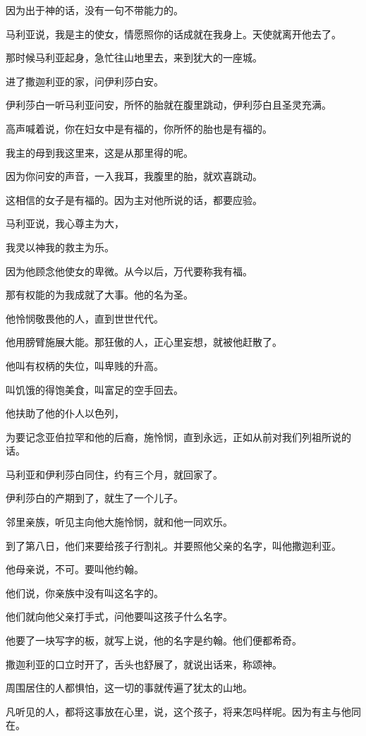 \documentclass[12pt,oneside]{book}
\begin{document}
因为出于神的话，没有一句不带能力的。

马利亚说，我是主的使女，情愿照你的话成就在我身上。天使就离开他去了。

那时候马利亚起身，急忙往山地里去，来到犹大的一座城。

进了撒迦利亚的家，问伊利莎白安。

伊利莎白一听马利亚问安，所怀的胎就在腹里跳动，伊利莎白且圣灵充满。

高声喊着说，你在妇女中是有福的，你所怀的胎也是有福的。

我主的母到我这里来，这是从那里得的呢。

因为你问安的声音，一入我耳，我腹里的胎，就欢喜跳动。

这相信的女子是有福的。因为主对他所说的话，都要应验。

马利亚说，我心尊主为大，

我灵以神我的救主为乐。

因为他顾念他使女的卑微。从今以后，万代要称我有福。

那有权能的为我成就了大事。他的名为圣。

他怜悯敬畏他的人，直到世世代代。

他用膀臂施展大能。那狂傲的人，正心里妄想，就被他赶散了。

他叫有权柄的失位，叫卑贱的升高。

叫饥饿的得饱美食，叫富足的空手回去。

他扶助了他的仆人以色列，

为要记念亚伯拉罕和他的后裔，施怜悯，直到永远，正如从前对我们列祖所说的话。

马利亚和伊利莎白同住，约有三个月，就回家了。

伊利莎白的产期到了，就生了一个儿子。

邻里亲族，听见主向他大施怜悯，就和他一同欢乐。

到了第八日，他们来要给孩子行割礼。并要照他父亲的名字，叫他撒迦利亚。

他母亲说，不可。要叫他约翰。

他们说，你亲族中没有叫这名字的。

他们就向他父亲打手式，问他要叫这孩子什么名字。

他要了一块写字的板，就写上说，他的名字是约翰。他们便都希奇。

撒迦利亚的口立时开了，舌头也舒展了，就说出话来，称颂神。

周围居住的人都惧怕，这一切的事就传遍了犹太的山地。

凡听见的人，都将这事放在心里，说，这个孩子，将来怎吗样呢。因为有主与他同在。
\end{document}

